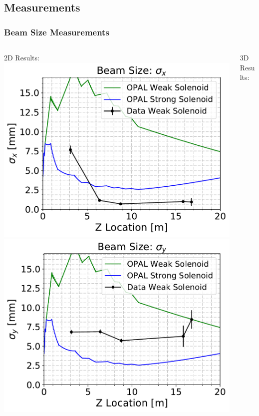 \documentclass[professionalfonts,t]{beamer}
\begin{document}
\subsection{Measurements}
\begin{frame}
	\frametitle{Beam Size Measurements}
	\vspace{-1em}
\begin{columns}[T] %
	\begin{column}{.5\textwidth}
		2D Results:
    \includegraphics[width=0.75\linewidth]{../images/beamsizes_2Dx} \\ \vspace{0.25em}
    \includegraphics[width=0.75\linewidth]{../images/beamsizes_2Dy}
	\end{column}%
	\hfill%
	\begin{column}{.5\textwidth}
		3D Results:

\end{column}
\end{columns}
\end{frame}
\end{document}
